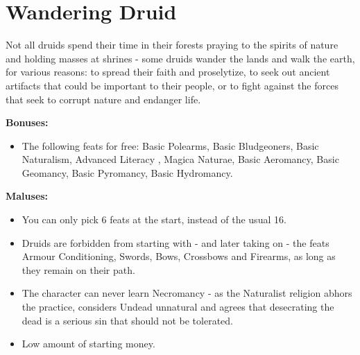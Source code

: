 \section{Wandering Druid}
Not all druids spend their time in their forests praying to the spirits of nature and holding masses at shrines - some druids wander the lands and walk the earth, for various reasons: to spread their faith and proselytize, to seek out ancient artifacts that could be important to their people, or to fight against the forces that seek to corrupt nature and endanger life.


\textbf{Bonuses:}
\begin{itemize}
	\item The following feats for free: Basic Polearms, Basic Bludgeoners, Basic Naturalism, Advanced Literacy , Magica Naturae, Basic Aeromancy, Basic Geomancy, Basic Pyromancy, Basic Hydromancy.
\end{itemize}


\textbf{Maluses:}
\begin{itemize}
	\item You can only pick 6 feats at the start, instead of the usual 16.
	\item Druids are forbidden from starting with - and later taking on - the feats Armour Conditioning, Swords, Bows, Crossbows and Firearms, as long as they remain on their path.
	\item The character can never learn Necromancy - as the Naturalist religion abhors the practice, considers Undead unnatural and agrees that desecrating the dead is a serious sin that should not be tolerated.
	\item Low amount of starting money.
\end{itemize}

